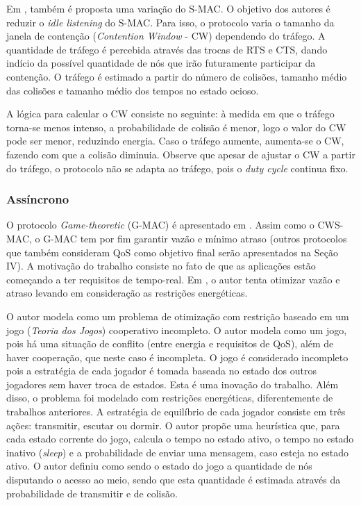\documentclass[12pt]{article}
\begin{document}
    Em \cite{20102012936055}, também é proposta uma variação do S-MAC. O objetivo dos autores é reduzir o \textit{idle listening} do S-MAC. Para isso, o protocolo varia o tamanho da janela de contenção (\textit{Contention Window} - CW) dependendo do tráfego. A quantidade de tráfego é percebida através das trocas de RTS e CTS, dando indício da possível quantidade de nós que irão futuramente participar da contenção. O tráfego é estimado a partir do número de colisões, tamanho médio das colisões e tamanho médio dos tempos no estado ocioso. 

    A lógica para calcular o CW consiste no seguinte: à medida em que o tráfego torna-se menos intenso, a probabilidade de colisão é menor, logo o valor do CW pode ser menor, reduzindo energia. Caso o tráfego aumente, aumenta-se o CW, fazendo com que a colisão diminuia. Observe que apesar de ajustar o CW a partir do tráfego, o protocolo não se adapta ao tráfego, pois o \textit{duty cycle} continua fixo.


  \subsubsection{Assíncrono}

    O protocolo \textit{Game-theoretic} (G-MAC) é apresentado em \cite{20093112234782}. Assim como o CWS-MAC, o G-MAC tem por fim garantir vazão e mínimo atraso (outros protocolos que também consideram QoS como objetivo final serão apresentados na Seção IV). A motivação do trabalho consiste no fato de que as aplicações estão começando a ter requisitos de tempo-real. Em \cite{20093112234782}, o autor tenta otimizar vazão e atraso levando em consideração as restrições energéticas. 

    O autor modela como um problema de otimização com restrição baseado em um jogo (\textit{Teoria dos Jogos}) cooperativo incompleto. O autor modela como um jogo, pois há uma situação de conflito (entre energia e requisitos de QoS), além de haver cooperação, que neste caso é incompleta. O jogo é considerado incompleto pois a estratégia de cada jogador é tomada baseada no estado dos outros jogadores sem haver troca de estados. Esta é uma inovação do trabalho. Além disso, o problema foi modelado com restrições energéticas, diferentemente de trabalhos anteriores. A estratégia de equilíbrio de cada jogador consiste em três ações: transmitir, escutar ou dormir. O autor propõe uma heurística que, para cada estado corrente do jogo, calcula o tempo no estado ativo, o tempo no estado inativo (\textit{sleep}) e a probabilidade de enviar uma mensagem, caso esteja no estado ativo. O autor definiu como sendo o estado do jogo a quantidade de nós disputando o acesso ao meio, sendo que esta quantidade é estimada através da probabilidade de transmitir e de colisão.
\end{document}
